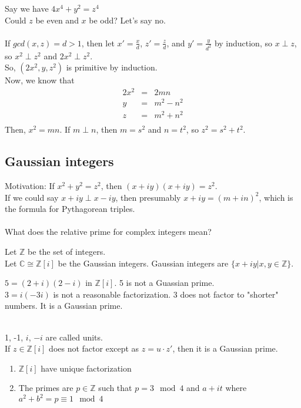   Say we have $4x^4 + y^2 = z^4$\\
  Could $z$ be even and $x$ be odd? Let's say no.\\\\
  If $gcd(x,z) = d > 1$, then let $x' = \frac{x}{d}$, $z' = \frac{z}{d}$, and
  $y' = \frac{y}{d^2}$ by induction, so $x \perp z$, so $x^2 \perp z^2$ and
  $2x^2 \perp z^2$.\\
  So, $(2x^2, y, z^2)$ is primitive by induction.\\
  Now, we know that
  \begin{eqnarray*}
    2x^2 & = & 2mn\\
    y & = & m^2 - n^2\\
    z & = & m^2 + n^2\\
  \end{eqnarray*}
  Then, $x^2 = mn$. If $m \perp n$, then $m = s^2$ and $n = t^2$, so $z^2 = 
  s^2 + t^2$.\\
  \subsection*{Gaussian integers}
    Motivation: If $x^2 + y^2 = z^2$, then $(x + iy)(x + iy) = z^2$.\\
    If we could say $x + iy \perp x - iy$, then presumably $x + iy = 
    (m+in)^2$, which is the formula for Pythagorean triples.\\\\
    What does the relative prime for complex integers mean?\\
    \begin{definition}
      Let $\mathbb{Z}$ be the set of integers.\\
      Let $\mathbb{C} \cong \mathbb{Z}[i]$ be the Gaussian integers. Gaussian
      integers are $\{x + iy | x,y \in \mathbb{Z}\}$.
    \end{definition}
    $5 = (2 + i)(2 - i)$ in $\mathbb{Z}[i]$. 5 is not a Guassian prime.\\
    $3 = i(-3i)$ is not a reasonable factorization. 3 does not factor to 
    "shorter" numbers. It is a Gaussian prime.\\\\
    \begin{definition}
      1, -1, $i$, $-i$ are called units.\\
      If $z \in \mathbb{Z}[i]$ does not factor except as $z = u \cdot
      z'$, then it is a Gaussian prime.
    \end{definition}
    \begin{theorem}
      \begin{enumerate}
        \item $\mathbb{Z}[i]$ have unique factorization
        \item The primes are $p \in \mathbb{Z}$ such that $p = 3 \mod 4$ and
          $a + it$ where $a^2 + b^2 = p \equiv 1 \mod 4$
      \end{enumerate}
    \end{theorem}

